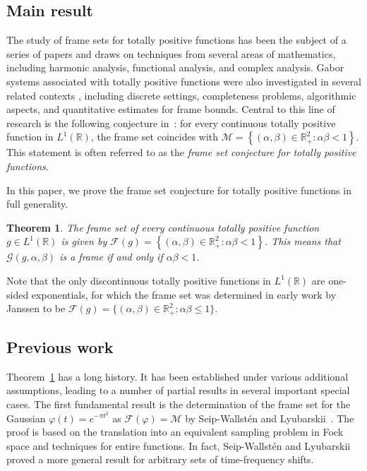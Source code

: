 \documentclass[reqno,a4paper,12pt]{amsart}
\numberwithin{equation}{section}
\newtheorem{theorem}[definition]{Theorem}
\def\R{{\mathbb R}}
\newcommand\1{\mathds{1}}
\newcommand{\ft}{{\mathcal{F}}}
\begin{document}
\subsection{Main result}
The study of frame sets for totally positive functions has been the
subject of a series of papers
\cite{grochenig2018sampling,Groechenig2023,GroechenigStoeckler2013,Janssen1996,Seip1992,lyubarskiiframes}
and draws  on techniques from several areas of mathematics, including harmonic analysis, functional analysis, and complex analysis. Gabor systems associated with totally positive functions were also investigated in several related contexts \cite{bannert2013discretized,grochenig2016completeness,kloos2016implementation,ghosh2025gabor}, including discrete settings, completeness problems, algorithmic aspects, and quantitative estimates for frame bounds.
Central to this line of research is the following conjecture %
in~\cite{mystery,GroechenigStoeckler2013}: for every continuous
totally positive function in $L^1(\R)$, the frame set coincides with
$\mathcal{M} = \left \{ (\alpha,\beta) \in \R_{+}^2 : \alpha\beta < 1  \right
\}$. This statement is often  referred to as the \emph{frame set
  conjecture for totally positive functions}. 

In this  paper, we prove the frame set conjecture for totally positive functions in full generality.

\begin{theorem}\label{thm:main}
The frame set of every continuous totally positive function $g \in
L^1(\R) $ is given by $\ft(g) = \left \{ (\alpha,\beta) \in \R_{+}^2 :
  \alpha\beta < 1  \right \}$. This means that $\mathcal{G}
(g,\alpha,\beta )$ is a frame if and only if $\alpha \beta <1$. 
\end{theorem}

Note that the only discontinuous totally positive functions in
$L^1(\R)$ are one-sided exponentials, for which the frame set was
determined in early work by Janssen \cite{Janssen1996} to be $\ft (g)
= \{
(\alpha,\beta) \in \R_{+}^2 : \alpha\beta \leq 1 \}$.  

\subsection{Previous work}
Theorem~\ref{thm:main} has a long history. It  has been established
under various additional assumptions, leading to a number of partial
results in several important special cases.
The first fundamental result is the determination of the frame set for
the Gaussian $\varphi(t) = e^{-\pi t^2}$  as $\ft(\varphi) =
\mathcal{M} $ by  Seip-Wallstén and
Lyubarskii~\cite{lyubarskiiframes,Seip1992,seip-wallsten}. The
proof is based on the  translation into an equivalent  sampling
problem in Fock space and techniques for entire functions. In fact,
Seip-Wallstén and Lyubarskii proved a more general result for
arbitrary sets of time-frequency shifts. 
\end{document}
